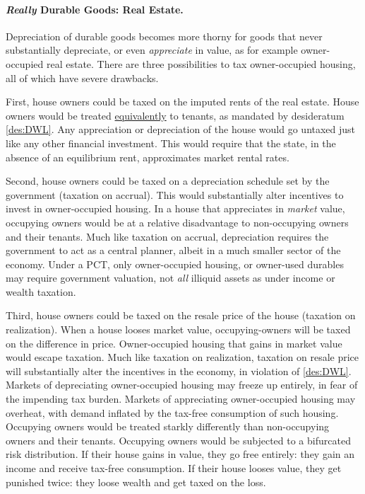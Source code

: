 \paragraph{\emph{Really} Durable Goods: Real Estate.} Depreciation of durable goods becomes more thorny for goods that never substantially depreciate, or even \emph{appreciate} in value, as for example owner-occupied real estate. There are three possibilities to tax owner-occupied housing, all of which have severe drawbacks.

First, house owners could be taxed on the imputed rents of the real estate. House owners would be treated \hyperref[des:DWL]{equivalently} to tenants, as mandated by desideratum \ref{des:DWL}. Any appreciation or depreciation of the house would go untaxed just like any other financial investment. This would require that the state, in the absence of an equilibrium rent, approximates market rental rates.

Second, house owners could be taxed on a depreciation schedule set by the government (taxation on accrual). This would substantially alter incentives to invest in owner-occupied housing. In a house that appreciates in \emph{market} value, occupying owners would be at a relative disadvantage to non-occupying owners and their tenants. Much like taxation on accrual, depreciation requires the government to act as a central planner, albeit in a much smaller sector of the economy. Under a PCT, only owner-occupied housing, or owner-used durables may require government valuation, not \emph{all} illiquid assets as under income or wealth taxation.

Third, house owners could be taxed on the resale price of the house (taxation on realization). When a house looses market value, occupying-owners will be taxed on the difference in price. Owner-occupied housing that gains in market value would escape taxation. Much like taxation on realization, taxation on resale price will substantially alter the incentives in the economy, in violation of \ref{des:DWL}. Markets of depreciating owner-occupied housing may freeze up entirely, in fear of the impending tax burden. Markets of appreciating owner-occupied housing may overheat, with demand inflated by the tax-free consumption of such housing. Occupying owners would be treated starkly differently than non-occupying owners and their tenants. Occupying owners would be subjected to a bifurcated risk distribution. If their house gains in value, they go free entirely: they gain an income and receive tax-free consumption. If their house looses value, they get punished twice: they loose wealth and get taxed on the loss.

